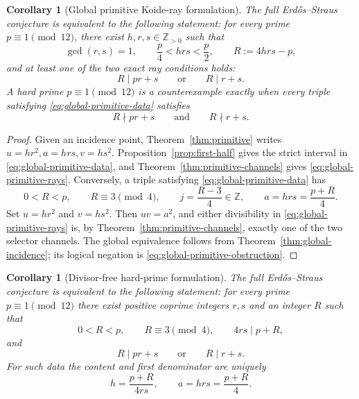 \documentclass[11pt]{article}
\newtheorem{corollary}[theorem]{Corollary}
\theoremstyle{definition}
\theoremstyle{remark}
\newcommand{\Z}{\mathbb Z}
\begin{document}
\begin{corollary}[Global primitive Koide-ray formulation]
\label{cor:global-primitive}
The full Erd\H{o}s--Straus conjecture is equivalent to the following statement:
for every prime \(p\equiv1\pmod{12}\), there exist
\(h,r,s\in\Z_{>0}\) such that
\begin{equation}\label{eq:global-primitive-data}
 \gcd(r,s)=1,
 \qquad
 \frac p4<hrs<\frac p2,
 \qquad
 R:=4hrs-p,
\end{equation}
and at least one of the two exact ray conditions holds:
\begin{equation}\label{eq:global-primitive-rays}
 R\mid pr+s
 \qquad\text{or}\qquad
 R\mid r+s.
\end{equation}
A hard prime \(p\equiv1\pmod{12}\) is a counterexample exactly when every
triple satisfying \eqref{eq:global-primitive-data} satisfies
\begin{equation}\label{eq:global-primitive-obstruction}
 R\nmid pr+s
 \qquad\text{and}\qquad
 R\nmid r+s.
\end{equation}
\end{corollary}

\begin{proof}
Given an incidence point, Theorem~\ref{thm:primitive} writes
\(u=hr^2,a=hrs,v=hs^2\).  Proposition~\ref{prop:first-half} gives the strict
interval in \eqref{eq:global-primitive-data}, and
Theorem~\ref{thm:primitive-channels} gives
\eqref{eq:global-primitive-rays}.  Conversely, a triple satisfying
\eqref{eq:global-primitive-data} has
\[
 0<R<p,
 \qquad R\equiv3\pmod4,
 \qquad j=\frac{R-3}{4}\in\Z,
 \qquad a=hrs=\frac{p+R}{4}.
\]
Set \(u=hr^2\) and \(v=hs^2\).  Then \(uv=a^2\), and either divisibility in
\eqref{eq:global-primitive-rays} is, by
Theorem~\ref{thm:primitive-channels}, exactly one of the two selector channels.
The global equivalence follows from Theorem~\ref{thm:global-incidence}; its
logical negation is \eqref{eq:global-primitive-obstruction}.
\end{proof}

\begin{corollary}[Divisor-free hard-prime formulation]
\label{cor:global-divisor-free}
The full Erd\H{o}s--Straus conjecture is equivalent to the following statement:
for every prime $p\equiv1\pmod{12}$ there exist positive coprime integers
$r,s$ and an integer $R$ such that
\begin{equation}\label{eq:divisor-free-range}
 0<R<p,
 \qquad R\equiv3\pmod4,
 \qquad 4rs\mid p+R,
\end{equation}
and
\begin{equation}\label{eq:divisor-free-rays}
 R\mid pr+s
 \qquad\text{or}\qquad
 R\mid r+s.
\end{equation}
For such data the content and first denominator are uniquely
\begin{equation}\label{eq:divisor-free-h-a}
 h=\frac{p+R}{4rs},
 \qquad a=hrs=\frac{p+R}{4}.
\end{equation}
\end{corollary}
\end{document}
